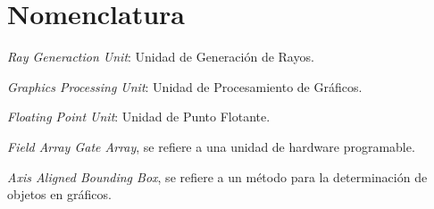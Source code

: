 \chapter{Nomenclatura}

\begin{description}[labelindent=1cm,labelwidth=2.25cm,align=left,leftmargin=3.45cm]  %

\item[$RGU$] \emph{Ray Generaction Unit}: Unidad de Generación de Rayos.

\item[$GPU$] \emph{Graphics Processing Unit}: Unidad de Procesamiento de Gráficos.

\item[$FPU$] \emph{Floating Point Unit}: Unidad de Punto Flotante.

\item[$FPGA$] \emph{Field Array Gate Array}, se refiere a una unidad de hardware programable.

\item[$AABB$] \emph{Axis Aligned Bounding Box}, se refiere a un método para la determinación de objetos en gráficos.





\end{description}
